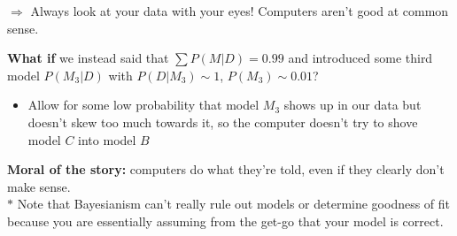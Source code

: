 \documentclass[12pt]{article}
\begin{document}
\vspace{11pt}

\hspace{1em} $\Rightarrow$ Always look at your data with your eyes! Computers aren't good at common sense.

\vspace{11pt}

\textbf{What if} we instead said that $\sum P(M|D) = 0.99$ and introduced some third model $P(M_3|D)$ with $P(D|M_3) \sim 1$, $P(M_3) \sim 0.01$?
\begin{itemize}
\renewcommand{\labelitemi}{$\Rightarrow$}
\item Allow for some low probability that model $M_3$ shows up in our data but doesn't skew too much towards it, so the computer doesn't try to shove model $C$ into model $B$
\end{itemize}

\vspace{11pt}

\textbf{Moral of the story:} computers do what they're told, even if they clearly don't make sense. \\

$\ast$ Note that Bayesianism can't really rule out models or determine goodness of fit because you are essentially assuming from the get-go that your model is correct.
\end{document}
